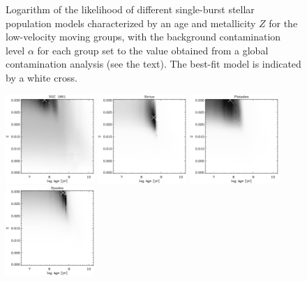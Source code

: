 \begin{figure}
\begin{center}
\caption[Logarithm of the likelihood of different single-burst stellar
  population models with the background contamination level $\alpha$
  for each group set to the value obtained from a global contamination
  analysis]{Logarithm of the likelihood of different single-burst
  stellar population models characterized by an age and metallicity
  $Z$ for the low-velocity moving groups, with the background
  contamination level $\alpha$ for each group set to the value
  obtained from a global contamination analysis (see the text). The
  best-fit model is indicated by a white
  cross.}\label{fig:fit_ssp_fixalpha}
\end{center}
\end{figure}


\clearpage
\begin{figure}
\begin{center}
\includegraphics[width=0.3\textwidth]{figs_groups/fit_ssp_fixpij_ngc1901.eps}
\includegraphics[width=0.3\textwidth]{figs_groups/fit_ssp_fixpij_sirius.eps}
\includegraphics[width=0.3\textwidth]{figs_groups/fit_ssp_fixpij_pleiades.eps}\\
\includegraphics[width=0.3\textwidth]{figs_groups/fit_ssp_fixpij_hyades.eps}

\end{center}
\end{figure}

